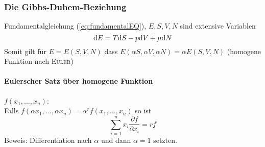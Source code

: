 \subsubsection{Die Gibbs-Duhem-Beziehung}
Fundamentalgleichung (\autoref{eq:fundamentalEQ}), $E, S, V, N$ sind extensive Variablen
\begin{equation}
    \mathrm{d} E = T \mathrm{d} S - p \mathrm{d} V + \mu \mathrm{d} N
\end{equation}
Somit gilt für $E=E(S, V, N)$ dass $E(\alpha S, \alpha V, \alpha N) = \alpha E(S, V, N)$ (homogene Funktion nach \textsc{Euler})
\paragraph{Eulerscher Satz über homogene Funktion} $f(x_1, \ldots, x_n)$: \\
Falls $f(\alpha x_1, \ldots, \alpha x_n) = \alpha^r f(x_1, \ldots, x_n)$ so ist
\begin{equation}
    \sum_{i=1}^{n} x_i \frac{\partial f}{\partial x_i} = r f
\end{equation}
Beweis: Differentiation nach $\alpha$ und dann $\alpha = 1$ setzten.
